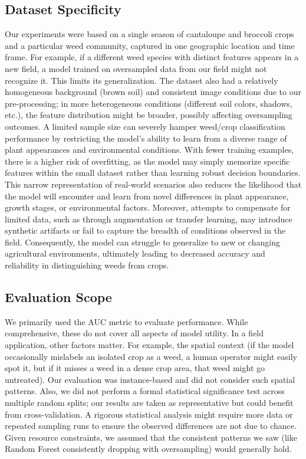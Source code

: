 \documentclass[letterpaper, notitlepage]{report}
\begin{document}
\subsection{Dataset Specificity}
Our experiments were based on a single season of cantaloupe and broccoli crops and a particular weed community, captured in one geographic location and time frame.  For example, if a different weed species with distinct features appears in a new field, a model trained on oversampled data from our field might not recognize it. This limits its generalization. The dataset also had a relatively homogeneous background (brown soil) and consistent image conditions due to our pre-processing; in more heterogeneous conditions (different soil colors, shadows, etc.), the feature distribution might be broader, possibly affecting oversampling outcomes.
A limited sample size can severely hamper weed/crop classification performance by restricting the model’s ability to learn from a diverse range of plant appearances and environmental conditions. With fewer training examples, there is a higher risk of overfitting, as the model may simply memorize specific features within the small dataset rather than learning robust decision boundaries. This narrow representation of real-world scenarios also reduces the likelihood that the model will encounter and learn from novel differences in plant appearance, growth stages, or environmental factors. Moreover, attempts to compensate for limited data, such as through augmentation or transfer learning, may introduce synthetic artifacts or fail to capture the breadth of conditions observed in the field. Consequently, the model can struggle to generalize to new or changing agricultural environments, ultimately leading to decreased accuracy and reliability in distinguishing weeds from crops.

\subsection{Evaluation Scope}
We primarily used the AUC metric to evaluate performance. While comprehensive, these do not cover all aspects of model utility. In a field application, other factors matter. For example, the spatial context (if the model occasionally mislabels an isolated crop as a weed, a human operator might easily spot it, but if it misses a weed in a dense crop area, that weed might go untreated). Our evaluation was instance-based and did not consider such spatial patterns. Also, we did not perform a formal statistical significance test across multiple random splits; our results are taken as representative but could benefit from cross-validation. A rigorous statistical analysis might require more data or repeated sampling runs to ensure the observed differences are not due to chance. Given resource constraints, we assumed that the consistent patterns we saw (like Random Forest consistently dropping with oversampling) would generally hold.
\end{document}
